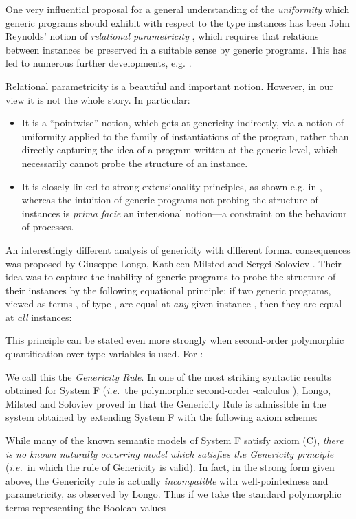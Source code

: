 \documentclass[a4paper,11pt]{article}
\newcommand{\ie}{\textit{i.e.}\ }
\begin{document}
One very influential proposal for a general understanding of the
\emph{uniformity} which generic programs should exhibit with respect
to the  type instances has been John Reynolds' notion of
\emph{relational parametricity} \cite{Rey83}, which requires that
relations between  instances be preserved in a suitable sense
by generic programs. This has led to numerous further
developments, e.g. \cite{MR92,ACC93,PA93}.

Relational parametricity is a beautiful and important notion. However,
in our view it is not the whole story. In particular:
\begin{itemize}
\item It is a ``pointwise'' notion, which gets at genericity
  indirectly, via a notion of uniformity applied to the family of
  instantiations of the program, rather than directly
  capturing the idea of a  program written at the generic level,
  which necessarily cannot probe the structure
  of an instance.
\item It is closely linked to strong extensionality principles, as
  shown e.g. in \cite{ACC93,PA93}, whereas the intuition of generic programs not
  probing the structure of instances is \textit{prima facie} an
intensional notion---a constraint on the behaviour of processes.
\end{itemize}
An interestingly different analysis of genericity with different
formal consequences was proposed by Giuseppe Longo, Kathleen Milsted
and Sergei Soloviev \cite{LMS93,Lon95}. Their idea
was to capture the inability of generic programs to probe the
structure of their instances by the following equational principle: if
two generic programs, viewed as terms ,  of type , are
equal at \emph{any} given instance , then they are equal at
\emph{all} instances:

This principle can be stated even more strongly when second-order
polymorphic quantification over type variables is used. For :

We call this the \emph{Genericity Rule}.
In one of the most striking syntactic results obtained for System F
(\ie the polymorphic second-order -calculus \cite{Gir72,Rey74}), Longo, Milsted
and Soloviev proved in \cite{LMS93} that the Genericity Rule is admissible in the system
obtained by extending System F with the following axiom scheme:

While many of the known semantic models of System F satisfy axiom (C),
\emph{there is no known naturally occurring model which satisfies the
  Genericity principle} (\ie in which the  rule of
  Genericity is valid). In fact, in the strong form given above, the
  Genericity rule is actually \emph{incompatible} with
  well-pointedness and parametricity, as observed by Longo. Thus if we
  take the standard polymorphic terms representing the Boolean values
\end{document}
